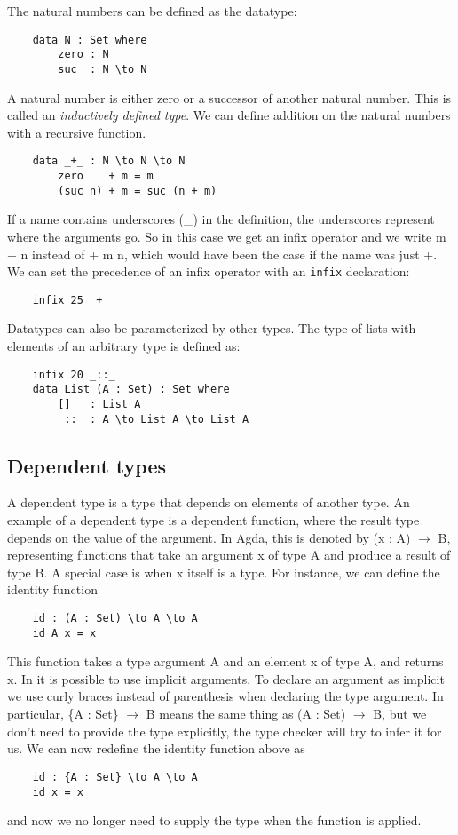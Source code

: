 \documentclass[titlepage]{article}
\begin{document}
The natural numbers can be defined as the datatype:
\begin{verbatim}
    data N : Set where
        zero : N
        suc  : N \to N
\end{verbatim}
A natural number is either zero or a successor of another natural number. This is called an \textit{inductively defined type}. We can define addition on the natural numbers with a recursive function.
\begin{verbatim}
    data _+_ : N \to N \to N
        zero    + m = m
        (suc n) + m = suc (n + m)
\end{verbatim}
If a name contains underscores (\_) in the definition, the underscores represent where the arguments go. So in this case we get an infix operator and we write m + n instead of + m n, which would have been the case if the name was just +. We can set the precedence of an infix operator with an \texttt{infix} declaration:
\begin{verbatim}
    infix 25 _+_
\end{verbatim}

Datatypes can also be parameterized by other types. The type of lists with elements of an arbitrary type is defined as:
\begin{verbatim}
    infix 20 _::_
    data List (A : Set) : Set where
        []   : List A
        _::_ : A \to List A \to List A
\end{verbatim}


\subsection{Dependent types}

A dependent type is a type that depends on elements of another type. An example of a dependent type is a dependent function, where the result type depends on the value of the argument.  In Agda, this is denoted by (x : A) $\to$ B, representing functions that take an argument x of type A and produce a result of type B. A special case is when x itself is a type. For instance, we can define the identity function
\begin{verbatim}
    id : (A : Set) \to A \to A
    id A x = x
\end{verbatim}
This function takes a type argument A and an element x of type A, and returns x. In \Agda it is possible to use implicit arguments. To declare an argument as implicit we use curly braces instead of parenthesis when declaring the type argument. In particular, \{A : Set\} $\to$ B means the same thing as (A : Set) $\to$ B, but we don't need to provide the type explicitly, the type checker will try to infer it for us. We can now redefine the identity function above as
\begin{verbatim}
    id : {A : Set} \to A \to A
    id x = x
\end{verbatim}
and now we no longer need to supply the type when the function is applied.
\end{document}
